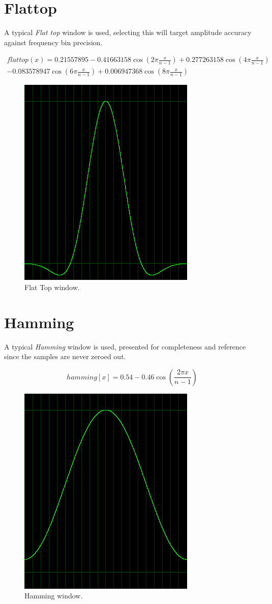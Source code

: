 \documentclass[10pt,a4paper]{report}
\begin{document}
\begin{appendices}
\section{Flattop}
A typical \textit{Flat top} window is used, selecting this will target amplitude accuracy against frequency bin precision.

\begin{align*}
flattop(x)=0.21557895 - 0.41663158\cos(2\pi\frac{x}{n-1})+ 0.277263158\cos(4\pi\frac{x}{n-1})\\
- 0.083578947\cos(6\pi\frac{x}{n-1}) + 0.006947368\cos(8\pi\frac{x}{n-1})
\end{align*}

\begin{figure}[H]
	\centering
	\includegraphics[width=0.4\linewidth]{images/windows/window-flattop.png}
	\caption[Flat Top window]{Flat Top window.}
	\label{fig:window-flattop}
\end{figure}

\section{Hamming}
A typical \textit{Hamming} window is used, presented for completeness and reference since the samples are never zeroed out.

\begin{equation}
hamming[x] = 0.54 - 0.46\cos(\frac{2\pi x}{n-1})
\end{equation}

\begin{figure}[H]
	\centering
	\includegraphics[width=0.4\linewidth]{images/windows/window-hamming.png}
	\caption[Hamming window]{Hamming window.}
	\label{fig:window-hamming}
\end{figure}


\end{appendices}
\end{document}
